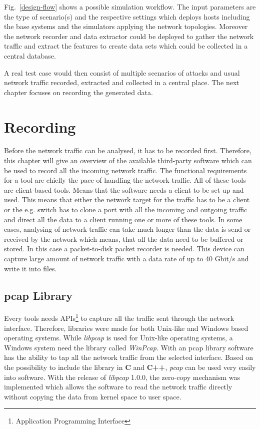 \documentclass[conference]{IEEEtran}
\begin{document}
Fig.~\ref{design-flow} shows a possible simulation workflow. The input parameters are the type of scenario(s) and the respective settings which deploys hosts including the base systems and the simulators applying the network topologies. Moreover the network recorder and data extractor could be deployed to gather the network traffic and extract the features to create data sets which could be collected in a central database.

A real test case would then consist of multiple scenarios of attacks and usual network traffic recorded, extracted and collected in a central place. The next chapter focuses on recording the generated data.

\section{Recording}

Before the network traffic can be analysed, it has to be recorded first. Therefore, this chapter will give an overview of the available third-party software which can be used to record all the incoming network traffic. The functional requirements for a tool are chiefly the pace of handling the network traffic. All of these tools are client-based tools. Means that the software needs a client to be set up and used. This means that either the network target for the traffic has to be a client or the e.g. switch has to clone a port with all the incoming and outgoing traffic and direct all the data to a client running one or more of these tools. In some cases, analysing of network traffic can take much longer than the data is send or received by the network which means, that all the data need to be buffered or stored. In this case a packet-to-disk packet recorder is needed. This device can capture large amount of network traffic with a data rate of up to 40 Gbit/s and write it into files. 

\subsection{pcap Library}

Every tools needs APIs\footnote{Application Programming Interface} to capture all the traffic sent through the network interface. Therefore, libraries were made for both Unix-like and Windows based operating systems. While \textit{libpcap} is used for Unix-like operating systems, a Windows system need the library called \textit{WinPcap}. With an pcap library software has the ability to tap all the network traffic from the selected interface. Based on the possibility to include the library in \textbf{C} and \textbf{C++}, \textit{pcap} can be used very easily into software. With the release of \textit{libpcap} 1.0.0, the zero-copy mechanism was implemented which allows the software to read the network traffic directly without copying the data from kernel space to user space.
\end{document}
